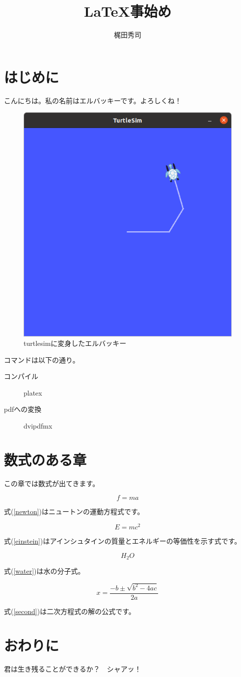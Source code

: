 \documentclass[12pt,epsf]{jarticle}
\begin{document}
\title{LaTeX事始め}
\author{梶田秀司}
\maketitle

\section{はじめに}
こんにちは。私の名前はエルバッキーです。よろしくね！

\begin{figure}[h]
 \centering
 \includegraphics[width=0.3\columnwidth]{turtlesim.png}
 \caption{turtlesimに変身したエルバッキー}
 \end{figure}
 
コマンドは以下の通り。
 \begin{description}
 \item[コンパイル] platex
 \item[pdfへの変換] dvipdfmx
 \end{description}
 
 
 \section{数式のある章}
 
 この章では数式が出てきます。
 
 \begin{equation}
 f = ma     \label{newton}
 \end{equation}
 
 式(\ref{newton})はニュートンの運動方程式です。
 
 \begin{equation}
 E = mc^2   \label{einstein}
 \end{equation}
 
 式(\ref{einstein})はアインシュタインの質量とエネルギーの等価性を示す式です。
 
 \begin{equation}
 H_2 O    \label{water}
 \end{equation}
 
 式(\ref{water})は水の分子式。
 
 \begin{equation}
 x = \frac{-b\pm \sqrt{b^2 - 4ac}}{2a}   \label{second}
 \end{equation}
 
 式(\ref{second})は二次方程式の解の公式です。
 \section{おわりに}
 君は生き残ることができるか？　シャアッ！
\end{document}
